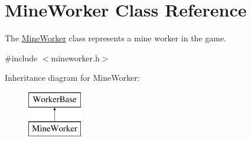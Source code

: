 \hypertarget{classMineWorker}{\section{Mine\-Worker Class Reference}
\label{classMineWorker}
}


The \hyperlink{classMineWorker}{Mine\-Worker} class represents a mine worker in the game.  




{\ttfamily \#include $<$mineworker.\-h$>$}

Inheritance diagram for Mine\-Worker\-:\begin{figure}[H]
\begin{center}
\leavevmode
\includegraphics[height=2.000000cm]{classMineWorker}
\end{center}
\end{figure}
